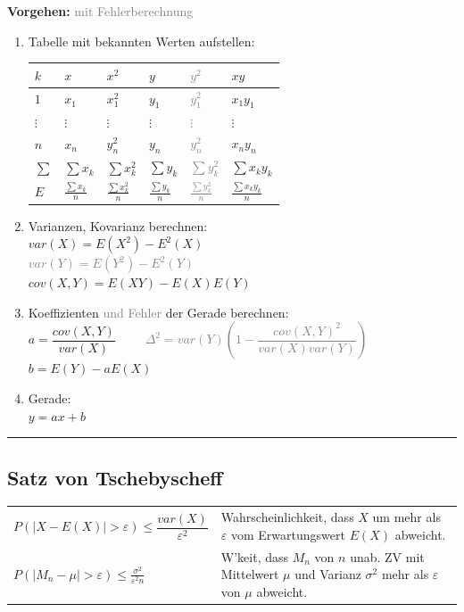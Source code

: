 	\begin{minipage}{10cm}
    
	\textbf{Vorgehen:} \textcolor{grey}{mit Fehlerberechnung}
	\begin{enumerate}
		\item Tabelle mit bekannten Werten aufstellen:\\
		\begin{tabular}{|l||l|l||l|l||l|}
		\hline
		\textbf{$k$} & \textbf{$x$} & \textbf{$x^2$} & \textbf{$y$} &
		\textcolor{grey}{\textbf{$y^2$}} & \textbf{$xy$} \\ \hline \hline
		$1$ & $x_1$ & $x_1^2$ & $y_1$ & \textcolor{grey}{$y_1^2$} & $x_1y_1$ \\ \hline
		$\vdots$ & $\vdots$ & $\vdots$ & $\vdots$ & \textcolor{grey}{$\vdots$} &
		$\vdots$ \\\hline
		$n$ & $x_n$ & $y_n^2$ & $y_n$ & \textcolor{grey}{$y_n^2$} & $x_ny_n$ \\ \hline
		\hline
		$\sum$ & $\sum x_k$ & $\sum x_k^2$ & $\sum y_k$ & \textcolor{grey}{$\sum
		y_k^2$} & $\sum x_ky_k$ \\ \hline
		$E$ & $\frac{\sum x_k}{n}$ & $\frac{\sum x_k^2}{n}$ & $\frac{\sum y_k}{n}$ &
		\textcolor{grey}{$\frac{\sum y_k^2}{n}$} & $\frac{\sum x_ky_k}{n}$ \\ \hline
		\end{tabular} 

		\item Varianzen, Kovarianz berechnen:\\
		$var(X) = E(X^2) - E^2(X)$ \\
		\textcolor{grey}{$var(Y) = E(Y^2) - E^2(Y)$} \\
		$cov(X,Y) = E(XY) - E(X)E(Y)$
		\item Koeffizienten \textcolor{grey}{und Fehler} der Gerade berechnen:\\
		$a=\dfrac{cov(X,Y)}{var(X)}$
		\textcolor{grey}{$\qquad\Delta^2=var(Y)\left(1-\dfrac{cov(X,Y)^2}
		{var(X)var(Y)}\right) $}\\ $b=E(Y)-aE(X)$
		\item Gerade:\\
		$y=ax+b$
	\end{enumerate}
	\end{minipage}
\vspace{2mm}
\hrule
		
	\subsection{Satz von Tschebyscheff }
		\begin{tabular}{ll}
        $P(\left| X-E(X)
        \right|>\varepsilon)\leq\dfrac{var(X)}{\varepsilon^2}$ &
        Wahrscheinlichkeit, dass $X$ um mehr als $\varepsilon$ vom
        Erwartungswert $E(X)$ abweicht.\\
        $P(|M_{n}-\mu|>\varepsilon)\leq \frac{\sigma^{2}}{\varepsilon^{2}n} $ &
        W'keit, dass $M_{n}$ von $n$ unab. ZV mit Mittelwert $\mu$ und
        Varianz $\sigma^{2}$ mehr als $\varepsilon$ von $\mu$ abweicht.
        \end{tabular}


